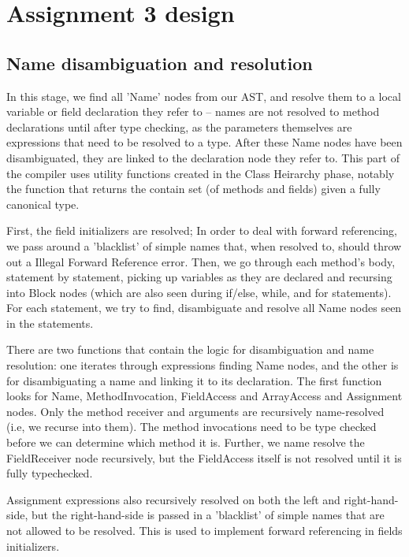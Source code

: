 \documentclass[12pt]{article}
\begin{document}
\section{Assignment 3 design}

\subsection{Name disambiguation and resolution}

In this stage, we find all 'Name' nodes from our AST, and resolve them to a
local variable or field declaration they refer to -- names are not resolved to method
declarations until after type checking, as the parameters themselves are expressions
that need to be resolved to a type. After these Name nodes have been
disambiguated, they are linked to the declaration node they refer to. This part
of the compiler uses utility functions created in the Class Heirarchy phase,
notably the function that returns the contain set (of methods and fields) given
a fully canonical type.

First, the field initializers are resolved;  In order to deal with forward
referencing, we pass around a 'blacklist' of simple names that, when resolved to,
should throw out a Illegal Forward Reference error. Then, we go through each
method's body, statement by statement, picking up variables as they are declared
and recursing into Block nodes (which are also seen during if/else, while, and
for statements).  For each statement, we try to find, disambiguate and resolve
all Name nodes seen in the statements.

There are two functions that contain the logic for disambiguation and name
resolution:  one iterates through expressions finding Name nodes,
and the other is for disambiguating a name and linking it to its declaration.  The first
function looks for Name, MethodInvocation, FieldAccess and ArrayAccess and
Assignment nodes.  Only the
method receiver and arguments are recursively name-resolved (i.e, we recurse
into them).  The method invocations need to be type checked before we can
determine which method it is.  Further, we name resolve the FieldReceiver node
recursively, but the FieldAccess itself is not resolved until it is fully
typechecked.

Assignment expressions also recursively resolved on both the left and
right-hand-side, but the right-hand-side is passed in a 'blacklist' of simple
names that are not allowed to be resolved.  This is used to implement forward
referencing in fields initializers.
\end{document}
